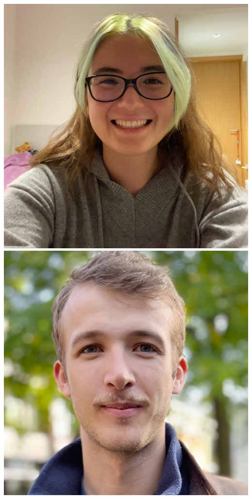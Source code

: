 \documentclass[aspectratio=169]{beamer}
\begin{document}
\begin{frame}
{        \includegraphics[width=0.09\textheight]{people/sinah_legner.jpg}%
        \includegraphics[width=0.09\textheight]{people/toby_lovick.jpg}%
}
\end{frame}
\end{document}
